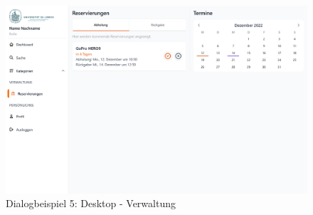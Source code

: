 \begin{figure}[p]
    \centering
    \includegraphics[scale=0.28]{Bilder/Dialgobeispiel/Verwaltung.png}
    \caption{Dialogbeispiel 5: Desktop - Verwaltung}\label{fig:georg}
\end{figure}
